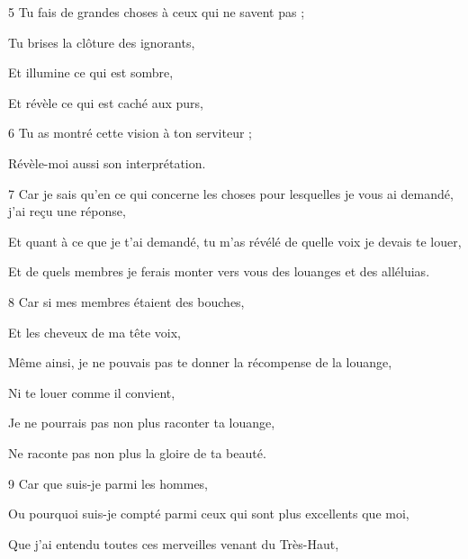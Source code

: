\par 5 Tu fais de grandes choses à ceux qui ne savent pas ;

\par Tu brises la clôture des ignorants,

\par Et illumine ce qui est sombre,

\par Et révèle ce qui est caché aux purs,

\par [Qui dans la foi se sont soumis à toi et à ta loi.]

\par 6 Tu as montré cette vision à ton serviteur ;

\par Révèle-moi aussi son interprétation.

\par 7 Car je sais qu'en ce qui concerne les choses pour lesquelles je vous ai demandé, j'ai reçu une réponse,

\par Et quant à ce que je t'ai demandé, tu m'as révélé de quelle voix je devais te louer,

\par Et de quels membres je ferais monter vers vous des louanges et des alléluias.

\par 8 Car si mes membres étaient des bouches,

\par Et les cheveux de ma tête voix,

\par Même ainsi, je ne pouvais pas te donner la récompense de la louange,

\par Ni te louer comme il convient,

\par Je ne pourrais pas non plus raconter ta louange,

\par Ne raconte pas non plus la gloire de ta beauté.

\par 9 Car que suis-je parmi les hommes,

\par Ou pourquoi suis-je compté parmi ceux qui sont plus excellents que moi,

\par Que j'ai entendu toutes ces merveilles venant du Très-Haut,


